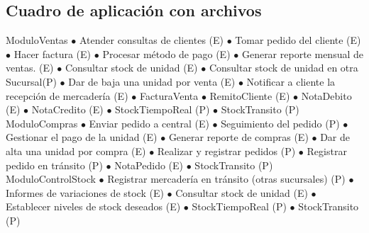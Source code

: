 \subsection{Cuadro de aplicación con archivos}

\begin{cuadroAplicacionArchivos}
  \cuadroAplicacionArchivosItem
    {ModuloVentas}
    {$\bullet$ Atender consultas de clientes (E) \newline
      $\bullet$ Tomar pedido del cliente (E)\newline
      $\bullet$ Hacer factura (E)\newline
      $\bullet$ Procesar método de pago (E)\newline
      $\bullet$ Generar reporte mensual de ventas. (E)\newline
      $\bullet$ Consultar stock de unidad (E)\newline
      $\bullet$ Consultar stock de unidad en otra Sucursal(P)\newline
      $\bullet$ Dar de baja una unidad por venta (E)\newline
      $\bullet$ Notificar a cliente la recepción de mercadería (E)
    }
    {$\bullet$ FacturaVenta\newline
      $\bullet$ RemitoCliente (E)\newline
      $\bullet$ NotaDebito (E)\newline
      $\bullet$ NotaCredito (E)\newline
      $\bullet$ StockTiempoReal (P)\newline
      $\bullet$ StockTransito (P)
    }
  \cuadroAplicacionArchivosItem
    {ModuloCompras}
    {$\bullet$ Enviar pedido a central (E)\newline
      $\bullet$ Seguimiento del pedido (P)\newline
      $\bullet$ Gestionar el pago de la unidad (E)\newline
      $\bullet$ Generar reporte de compras (E)\newline
      $\bullet$ Dar de alta una unidad por compra (E)\newline
      $\bullet$ Realizar y registrar pedidos (P)\newline
      $\bullet$ Registrar pedido en tránsito (P)
    }
    {$\bullet$ NotaPedido (E)\newline
      $\bullet$ StockTransito (P)
    }
  \cuadroAplicacionArchivosItem
    {ModuloControlStock}
    {$\bullet$ Registrar mercadería en tránsito (otras sucursales) (P)\newline
      $\bullet$ Informes de variaciones de stock (E)\newline
      $\bullet$ Consultar stock de unidad (E)\newline
      $\bullet$ Establecer niveles de stock deseados (E)
    }
    {$\bullet$ StockTiempoReal (P)\newline
      $\bullet$ StockTransito (P)
    }
\end{cuadroAplicacionArchivos}

